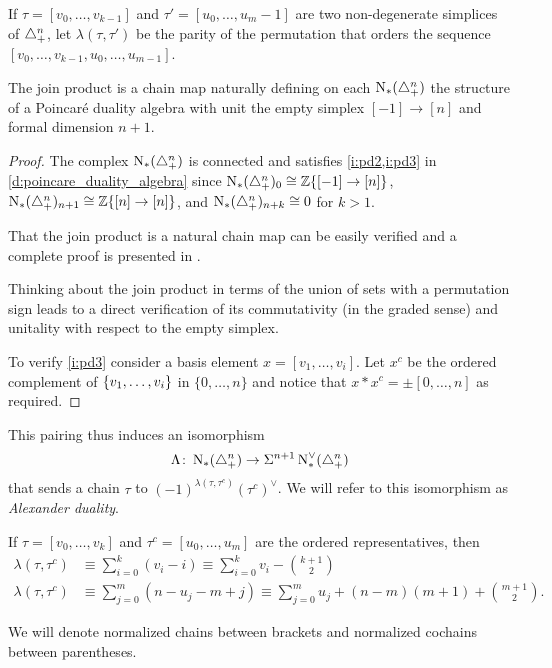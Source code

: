 \begin{notation}
	If $\tau = [v_0,\dots,v_{k-1}]$ and $\tau'=[u_0,\dots,u_{m}-1]$ are two non-degenerate simplices of $\triangle_{+}^n$, let $\lambda(\tau,\tau')$ be the parity of the permutation that orders the sequence $[v_0,\dots,v_{k-1},u_0,\dots,u_{m-1}]$.
\end{notation}

\begin{theorem}
	The join product is a chain map naturally defining on each $\operatorname{N}_{*}(\triangle_{+}^{n})$ the structure of a Poincar\'e duality algebra with unit the empty simplex $[-1] \to [n]$ and formal dimension $n+1$.
\end{theorem}


\begin{proof}
	The complex $\operatorname{N}_{*}(\triangle_{+}^{n})$ is connected and satisfies \cref{i:pd2,i:pd3} in \cref{d:poincare_duality_algebra} since $\operatorname{N}_{*}(\triangle_{+}^{n})_0 \cong \mathbb{Z}\{[-1] \to [n]\}$, $\operatorname{N}_{*}(\triangle_{+}^{n})_{n+1} \cong \mathbb{Z}\{[n] \to [n]\}$, and $\operatorname{N}_{*}(\triangle_{+}^{n})_{n+k} \cong 0$ for $k>1$.

	That the join product is a natural chain map can be easily verified and a complete proof is presented in \cite[p.19]{medina2020prop1}.

	Thinking about the join product in terms of the union of sets with a permutation sign leads to a direct verification of its commutativity (in the graded sense) and unitality with respect to the empty simplex.

	To verify \cref{i:pd3} consider a basis element $x = [v_1,\dots,v_i]$.
	Let $x^c$ be the ordered complement of $\{v_1,\dots,v_i\}$ in $\{0,\dots,n\}$ and notice that $x \ast x^c = \pm [0,\dots,n]$ as required.
\end{proof}
This pairing thus induces an isomorphism
\begin{equation}\label{eq:iso1}
	\Lambda \colon \operatorname{N}_{*}(\triangle_{+}^n) \to \Sigma^{n+1}\operatorname{N}^\vee_{*}(\triangle_{+}^n)
\end{equation}
 that sends a chain $\tau$ to $(-1)^{\lambda(\tau,\tau^c)}(\tau^c)^\vee$. We will refer to this isomorphism as \emph{Alexander duality}.

\begin{remark}\label{remark:alex}
 If $\tau = [v_0,\dots,v_k]$ and $\tau^c = [u_0,\dots,u_m]$ are the ordered representatives, then
 \begin{align*}
 \lambda(\tau,\tau^c)&\equiv \sum_{i=0}^k (v_i-i) \equiv \sum_{i=0}^k v_i - \binom{k+1}{2} \\
 \lambda(\tau,\tau^c)&\equiv \sum_{j=0}^m (n-u_j-m+j) \equiv \sum_{j=0}^m u_j +(n-m)(m+1)+\binom{m+1}{2}.
 \end{align*}
\end{remark}

\begin{notation} We will denote normalized chains between brackets and normalized cochains between parentheses.
\end{notation}